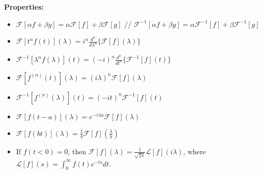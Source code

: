 {\bf Properties:} 
\begin{itemize}
\item $\mathcal{F}[\alpha f+\beta g]=\alpha \mathcal{F}[f]+\beta \mathcal{F}[g]$ // $\mathcal{F}^{-1}[\alpha f+\beta g]=\alpha \mathcal{F}^{-1}[f]+\beta \mathcal{F}^{-1}[g]$
\item $\mathcal{F}[t^nf(t)](\lambda)=i^n\frac{d^n}{d\lambda^n}\{\mathcal{F}[f](\lambda)\}$
\item $\mathcal{F}^{-1}[\lambda^nf(\lambda)](t)=(-i)^n\frac{d^n}{dt^n}\{\mathcal{F}^{-1}[f](t)\}$
\item $\mathcal{F}[f^{(n)}(t)](\lambda)=(i\lambda)^n\mathcal{F}[f](\lambda)$
\item $\mathcal{F}^{-1}[f^{(n)}(\lambda)](t)=(-it)^n\mathcal{F}^{-1}[f](t)$
\item $\mathcal{F}[f(t-a)](\lambda)=e^{-i\lambda a}\mathcal{F}[f](\lambda)$
\item $\mathcal{F}[f(bt)](\lambda)=\frac{1}{b}\mathcal{F}[f](\frac{\lambda}{b})$
\item If $f(t<0)=0$, then $\mathcal{F}[f](\lambda)=\frac{1}{\sqrt{2\pi}}\mathcal{L}[f](i\lambda)$, where \newline $\mathcal{L}[f](s)=\int_0^{\infty}f(t)e^{-ts}dt$.
\end{itemize}